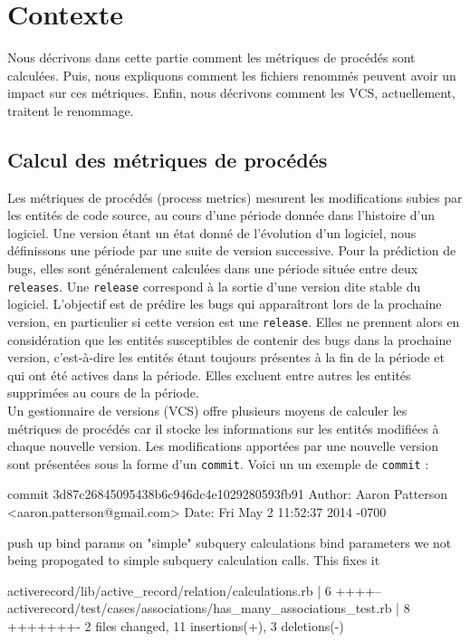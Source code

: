 \section{Contexte}
\label{sec:metriques}

Nous décrivons dans cette partie comment les métriques de procédés sont calculées. Puis, nous expliquons comment les fichiers renommés peuvent avoir un impact sur ces métriques. Enfin, nous décrivons comment les VCS, actuellement, traitent le renommage.

\subsection{Calcul des métriques de procédés}

Les métriques de procédés (process metrics) mesurent les modifications subies par les entités de code source, au cours d'une période donnée dans l'histoire d'un logiciel. Une version étant un état donné de l'évolution d'un logiciel, nous définissons une période par une suite de version successive. Pour la prédiction de bugs, elles sont généralement calculées dans une période située entre deux \texttt{releases}. Une \texttt{release} correspond à la sortie d'une version dite stable du logiciel. L'objectif est de prédire les bugs qui apparaîtront lors de la prochaine version, en particulier si cette version est une \texttt{release}. Elles ne prennent alors en considération que les entités susceptibles de contenir des bugs dans la prochaine version, c'est-à-dire les entités étant toujours présentes à la fin de la période et qui ont été actives dans la période. Elles excluent entre autres les entités supprimées au cours de la période.\\

Un gestionnaire de versions (VCS) offre plusieurs moyens de calculer les métriques de procédés car il stocke les informations sur les entités modifiées à chaque nouvelle version. Les modifications apportées par une nouvelle version sont présentées sous la forme d'un \texttt{commit}. Voici un un exemple de \texttt{commit} :\\

\begingroup
	\fontsize{8pt}{12pt}\selectfont
	\centering\begin{boxedverbatim}
	commit 3d87c26845095438b6c946dc4e1029280593fb91	
	Author: Aaron Patterson <aaron.patterson@gmail.com>
	Date:   Fri May 2 11:52:37 2014 -0700

	    push up bind params on "simple" subquery calculations 
	    bind parameters we not being propogated to simple subquery 
	    calculation calls. This fixes it

	 activerecord/lib/active_record/relation/calculations.rb            |    6 ++++--
	 activerecord/test/cases/associations/has_many_associations_test.rb |    8 +++++++-
	 2 files changed, 11 insertions(+), 3 deletions(-)
	\end{boxedverbatim}
\endgroup
\linebreak



